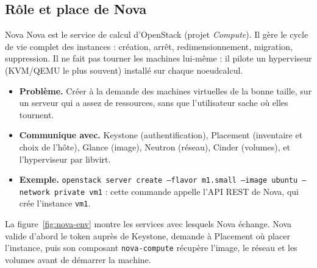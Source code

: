 \subsection{Rôle et place de Nova}\label{sec:nova-role}

\begin{definition}{Nova}
Nova est le service de calcul d'OpenStack (projet \emph{Compute}). Il gère le cycle de vie complet des
\glspl{instance} : création, arrêt, redimensionnement, migration, suppression. Il ne fait pas tourner les
machines lui-même : il pilote un \gls{hyperviseur} (KVM/QEMU le plus souvent) installé sur chaque
\gls{noeudcalcul}.
\end{definition}

\begin{itemize}
  \item \textbf{Problème.} Créer à la demande des machines virtuelles de la bonne taille, sur un serveur qui
        a assez de ressources, sans que l'utilisateur sache où elles tournent.
  \item \textbf{Communique avec.} Keystone (authentification), Placement (inventaire et choix de l'hôte),
        Glance (image), Neutron (réseau), Cinder (volumes), et l'hyperviseur par \gls{libvirt}.
  \item \textbf{Exemple.} \texttt{openstack server create --flavor m1.small --image ubuntu --network private
        vm1} : cette commande appelle l'API REST de Nova, qui crée l'instance \texttt{vm1}.
\end{itemize}

La figure~\ref{fig:nova-env} montre les services avec lesquels Nova échange. Nova valide d'abord le
token auprès de Keystone, demande à Placement où placer l'instance, puis son composant \texttt{nova-compute}
récupère l'image, le réseau et les volumes avant de démarrer la machine.

